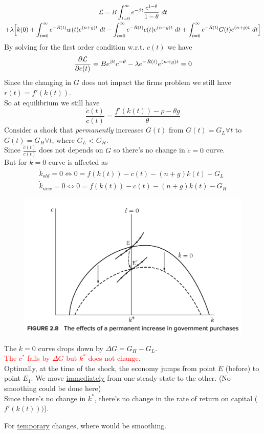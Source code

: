 \documentclass[]{article}
\begin{document}
			\begin{gather*}
				\mathcal{{L}} = B \int_{t=0}^\infty e^{-\beta t} \frac{c^{1-\theta}}{1-\theta}\ dt \\
				+ \lambda \Big[ k(0) + \int_{t=0}^\infty e^{-R(t)} w(t) e^{(n+g)t} \ dt - \int_{t=0}^\infty e^{-R(t)} c(t) e^{(n+g)t}\ dt + \int_{t=0}^\infty e^{-R(t)} G(t) e^{(n+g)t}\ dt\Big]
			\end{gather*}
			By solving for the first order condition w.r.t. $c(t)$ we have 
			\[
				\frac{\partial{\mathcal{{L}}}}{\partial{c(t)}} = B e^{\beta t} c^{-\theta} - \lambda e^{-R(t)} e^{(n+g)t} = 0
			\]
			Since the changing in $G$ does not impact the firms problem we still have $r(t) = f'(k(t))$. \\
			So at equilibrium we still have 
			\[
				\frac{\dot{c}(t)}{c(t)} = \frac{f'(k(t)) - \rho - \theta g}{\theta}
			\]
			Consider a shock that \emph{permanently} increases $G(t)$ from $G(t) = G_L \forall t$ to $G(t) = G_H \forall t$, where $G_L < G_H$. \\
			Since $\frac{\dot{c}(t)}{c(t)}$ does not depends on $G$ so there's no change in $\dot{c}=0$ curve. \\
			But for $\dot{k}=0$ curve is affected as
			\begin{gather*}
				\dot{k}_{old} = 0 \iff 0 = f(k(t)) - c(t) - (n+g)k(t) - G_L \\ 
				\dot{k}_{new} = 0 \iff 0 = f(k(t)) - c(t) - (n+g)k(t) - G_H
			\end{gather*}
			\begin{figure}[h]
				\centering
				\includegraphics[width=0.8\linewidth]{figures/7_2}
			\end{figure}
			The $\dot{k}=0$ curve drops down by $\Delta G = G_H - G_L$. \\
			\textcolor{red}{The $c^*$ falls by $\Delta G$ but $k^*$ does not change.} \\
			Optimally, at the time of the shock, the economy jumps from point $E$ (before) to point $E_1$. We move \ul{immediately} from one steady state to the other. (No smoothing could be done here) \\
			Since there's no change in $k^*$, there's no change in the rate of return on capital ($f'(k(t)))$).
			\begin{remark}
				For \ul{temporary} changes, where would be smoothing.
			\end{remark}
	
\end{document}
